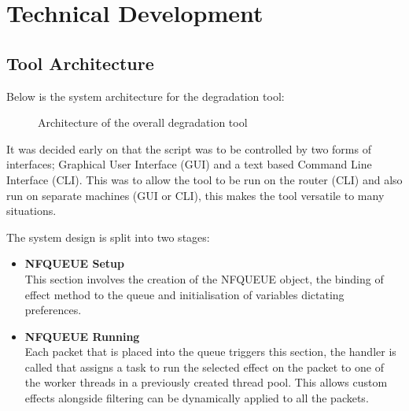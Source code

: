 

\chapter{Technical Development}

%
\section{Tool Architecture}
Below is the system architecture for the degradation tool:

\begin{center}
	
	\begin{figure}[h]
		\caption{Architecture of the overall degradation tool}
	\end{figure}
\end{center}

It was decided early on that the script was to be controlled by two forms of interfaces; Graphical User Interface (GUI) and a text based Command Line Interface (CLI). This was to allow the tool to be run on the router (CLI) and also run on separate machines (GUI or CLI), this makes the tool versatile to many situations.

The system design is split into two stages:

\begin{itemize}
\item {\bf NFQUEUE Setup}\\
This section involves the creation of the NFQUEUE object, the binding of effect method to the queue and initialisation of variables dictating preferences.

\item {\bf NFQUEUE Running}\\
Each packet that is placed into the queue triggers this section, the handler is called that assigns a task to run the selected effect on the packet to one of the worker threads in a previously created thread pool. This allows custom effects alongside filtering can be dynamically applied to all the packets.
\end{itemize}

